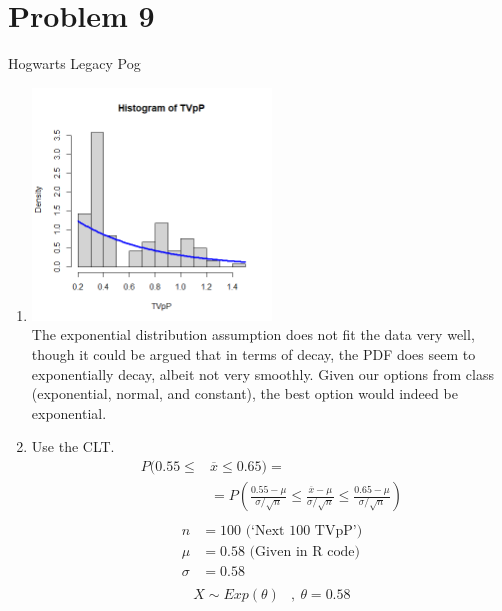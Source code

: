 \documentclass{article}
\begin{document}
\pagebreak
\section*{Problem 9}
Hogwarts Legacy Pog
\begin{enumerate}[label=\alph*)]
    \item \includegraphics[width=0.5\textwidth]{hogwarts.png} \\
          The exponential distribution assumption does not fit the data very well, though it could be argued that in terms of decay, the PDF does seem to exponentially decay, albeit not very smoothly.
          Given our options from class (exponential, normal, and constant), the best option would indeed be exponential.
    \item Use the CLT.
          \begin{align*}
              P(0.55 \leq & \overline{x}  \leq 0.65) =                                                                                                      \\
                          & = P(\frac{0.55 - \mu}{\sigma/\sqrt{n}} \leq \frac{\overline{x} - \mu}{\sigma/\sqrt{n}} \leq \frac{0.65 - \mu}{\sigma/\sqrt{n}}) \\
          \end{align*}
          \begin{align*}
              n      & = 100 \text{ (`Next 100 TVpP')}  \\
              \mu    & = 0.58 \text{ (Given in R code)} \\
              \sigma & = 0.58                           \\
          \end{align*}
          \begin{align*}
              X \sim Exp(\theta)& ,\ \theta = 0.58                                                                                    \\

\end{align*}
\end{enumerate}
\end{document}
